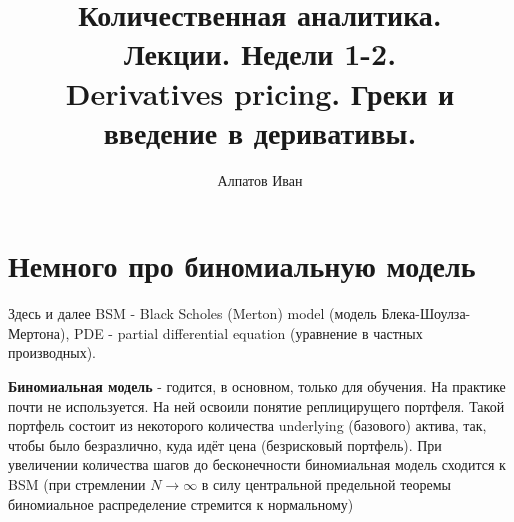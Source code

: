 \documentclass{article}
\title{Количественная аналитика.\\
Лекции. Недели 1-2. \\
Derivatives pricing. Греки и введение  в деривативы.}
\author{Алпатов Иван}
\begin{document}
\maketitle

\setcounter{tocdepth}{1} %
\renewcommand\contentsname{Contents}
\tableofcontents
\newpage




\renewcommand{\labelitemi}{\tiny$\bullet$}
\renewcommand{\figurename}{Рис.}

 \section{Немного про биномиальную модель}
 Здесь и далее BSM - Black Scholes (Merton) model (модель Блека-Шоулза-Мертона), PDE - partial differential equation (уравнение в частных производных).
 
\textbf{Биномиальная модель} - годится, в основном, только для обучения. На практике почти не используется. На ней освоили понятие реплицирущего портфеля. Такой портфель состоит из некоторого количества underlying (базового) актива, так, чтобы было безразлично, куда идёт цена (безрисковый портфель). При увеличении количества шагов до бесконечности биномиальная модель сходится к BSM (при стремлении \(N \rightarrow \infty\) в силу центральной предельной теоремы биномиальное распределение стремится к нормальному)
\end{document}
